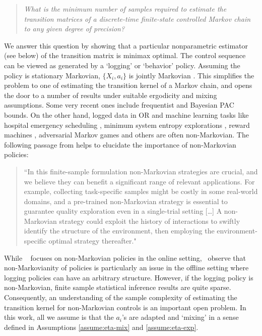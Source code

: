 \documentclass[opre,sglanonrev]{informs4}
\numberwithin{equation}{section}
\begin{document}
{{\begin{quote}
\centering
        \textit{What is the minimum number of samples required to estimate the transition matrices of a discrete-time finite-state controlled Markov chain to any given degree of precision?}
\end{quote}
}
We answer this question by showing that a particular nonparametric estimator (see below) of the transition matrix is minimax optimal. The control sequence can be viewed as generated by a `logging' or `behavior' policy. { Assuming} the policy is stationary Markovian, $\{X_i,a_i\}$ is jointly Markovian  \citep[Chapter 2.3]{hernandez1991recurrence}. 
This simplifies the problem to one of estimating the transition kernel of a Markov chain, and opens the door to a number of results under suitable ergodicity and mixing assumptions. 
Some very recent ones include frequentist \citep{wolfer2021statistical} and Bayesian \citep{banerjee2021pac} PAC bounds. %
% 
On the other hand, logged data in OR and machine learning tasks like hospital emergency scheduling \citep{lee_markov_2018}, minimum system entropy explorations  \citep{mutti2022importance}, reward machines \citep{icarte_using_2018}, adversarial Markov games \citep{wang2023foundation} and others are often non-Markovian. 
    The following passage from \cite{mutti2022importance} helps to elucidate the importance of non-Markovian policies:
    \begin{quote}
    ``In this finite-sample formulation non-Markovian strategies are crucial, and we believe they can benefit a significant range of relevant applications. For example, collecting task-specific samples might be costly in some real-world domains, and a pre-trained non-Markovian strategy is essential to guarantee quality exploration even in a single-trial setting [\dots] A non-Markovian strategy could exploit the history of interactions to swiftly identify the structure of the environment, then employing the environment-specific optimal strategy thereafter."
    \end{quote}
    While
    ~\cite{mutti2022importance} focuses on non-Markovian policies in the online setting,~\cite{laroche2022non,laroche23a} observe that non-Markovianity of policies is particularly an issue in the offline setting where logging policies can have an arbitrary structure. However, if the logging policy is non-Markovian, finite sample statistical inference results are quite sparse.
Consequently, an understanding of the sample complexity of estimating the transition kernel for  non-Markovian controls is an important open problem. In this work, all we assume is that the $a_i$'s are adapted and `mixing' in a sense defined in Assumptions \ref{assume:eta-mix} and \ref{assume:eta-exp}.
}
\end{document}
